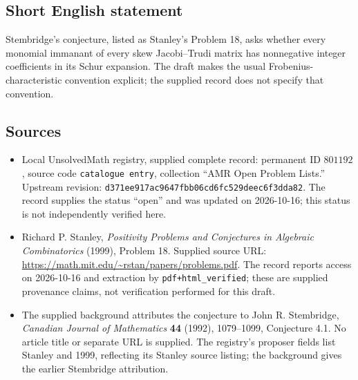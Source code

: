 \documentclass[11pt]{article}
\begin{document}
\subsection{Short English statement}
Stembridge's conjecture, listed as Stanley's Problem 18, asks whether every monomial immanant of every skew Jacobi--Trudi matrix has nonnegative integer coefficients in its Schur expansion. The draft makes the usual Frobenius-characteristic convention explicit; the supplied record does not specify that convention.
\subsection{Sources}
\begin{itemize}
\item Local UnsolvedMath registry, supplied complete record: permanent ID \(801192\), source code \texttt{catalogue entry}, collection ``AMR Open Problem Lists.'' Upstream revision: \texttt{d371ee917ac9647fbb06cd6fc529deec6f3dda82}. The record supplies the status ``open'' and was updated on 2026-10-16; this status is not independently verified here.
\item Richard P. Stanley, \emph{Positivity Problems and Conjectures in Algebraic Combinatorics} (1999), Problem 18. Supplied source URL: \url{https://math.mit.edu/~rstan/papers/problems.pdf}. The record reports access on 2026-10-16 and extraction by \texttt{pdf+html\_verified}; these are supplied provenance claims, not verification performed for this draft.
\item The supplied background attributes the conjecture to John R. Stembridge, \emph{Canadian Journal of Mathematics} \textbf{44} (1992), 1079--1099, Conjecture 4.1. No article title or separate URL is supplied. The registry's proposer fields list Stanley and 1999, reflecting its Stanley source listing; the background gives the earlier Stembridge attribution.
\end{itemize}
\end{document}
